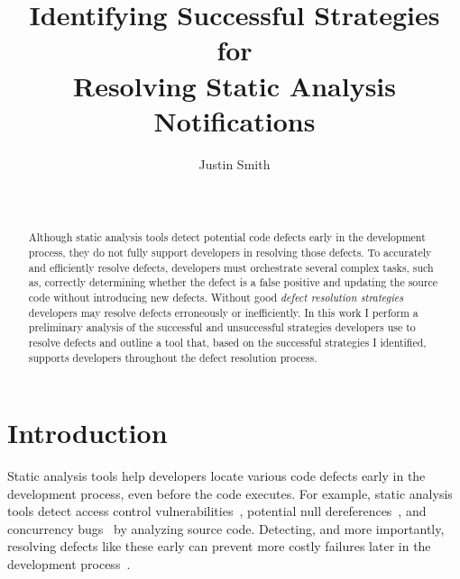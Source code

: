 \documentclass{sig-alternate}
\begin{document}
\toappear{}
\title{Identifying Successful Strategies for \\ Resolving Static Analysis Notifications}

\author{
\alignauthor Justin Smith\\
\\
 \\
}

\maketitle


\begin{abstract}
Although static analysis tools detect potential code defects early in the development process, they do not fully support developers in resolving those defects.
To accurately and efficiently resolve defects, developers must orchestrate several complex tasks, such as, correctly determining whether the defect is a false positive and updating the source code without introducing new defects.
Without good \textit{defect resolution strategies} developers may resolve defects erroneously or inefficiently.
In this work I perform a preliminary analysis of the successful and unsuccessful strategies developers use to resolve defects and outline a tool that, based on the successful strategies I identified, supports developers throughout the defect resolution process. 


\end{abstract}


\section{Introduction}
\label{sec:intro}
Static analysis tools help developers locate various code defects early in the development process, even before the code executes. 
For example, static analysis tools detect access control vulnerabilities~\cite{Aside}, potential null dereferences~\cite{FindBugs}, and concurrency bugs~\cite{ThreadSafe} by analyzing source code.
Detecting, and more importantly, resolving defects like these early can prevent more costly failures later in the development process~\cite{ayewah2008using}.
\end{document}

